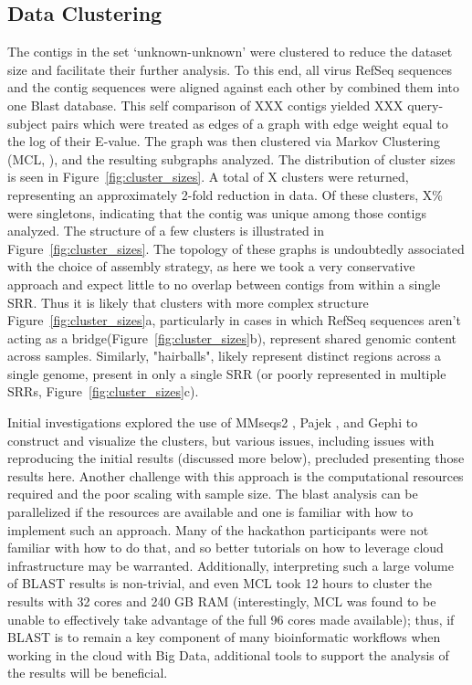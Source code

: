   \subsection{Data Clustering}
  The contigs in the set ‘unknown-unknown’ were clustered to reduce the dataset
  size and facilitate their  further analysis. To this end, all virus RefSeq
  sequences and the contig sequences were aligned against each other by
  combined them  into one Blast database. This self comparison of XXX contigs
  yielded XXX query-subject pairs which were treated as edges of a graph with
  edge weight equal to the log of their E-value. The graph was then clustered
  via Markov Clustering (MCL, \cite{Enright2002}), and the resulting subgraphs
  analyzed. The distribution of cluster sizes is seen in
  Figure~\ref{fig:cluster_sizes}. A total of X clusters were returned,
  representing an approximately 2-fold reduction in data. Of these clusters,
  X\% were singletons, indicating that the contig was unique among those
  contigs analyzed. The structure of a few clusters is illustrated in
  Figure~\ref{fig:cluster_sizes}. The topology of these graphs is undoubtedly
  associated with the choice of assembly strategy, as here we took a very
  conservative approach and expect little to no overlap between contigs from
  within a single SRR. Thus it is likely that clusters with more complex
  structure Figure~\ref{fig:cluster_sizes}a, particularly in cases in which
  RefSeq sequences aren't acting as a bridge(Figure~\ref{fig:cluster_sizes}b),
  represent shared genomic content across samples. Similarly, "hairballs",
  likely represent distinct regions across a single genome, present in only a
  single SRR (or poorly represented in multiple SRRs,
  Figure~\ref{fig:cluster_sizes}c).

  Initial investigations explored the use of MMseqs2 \cite{Mirdita2019}, Pajek
  \cite{Batagelj2004}, and  Gephi \cite{Bastian2009} to construct and visualize
  the clusters, but various issues, including issues with reproducing the
  initial results (discussed more below), precluded presenting those results
  here. Another challenge with this approach is the computational resources
  required and the poor scaling with sample size. The blast analysis can be
  parallelized if the resources are available and one is familiar with how to
  implement such an approach. Many of the hackathon participants were not
  familiar with how to do that, and so better tutorials on how to leverage
  cloud infrastructure may be warranted. Additionally, interpreting such a
  large volume of BLAST results is non-trivial, and even MCL took 12 hours to
  cluster the results with 32 cores and 240 GB RAM (interestingly, MCL was
  found to be unable to effectively take advantage of the full 96 cores made
  available); thus, if BLAST is to remain a key component of many bioinformatic
  workflows when working in the cloud with Big Data, additional tools to
  support the analysis of the results will be beneficial.

